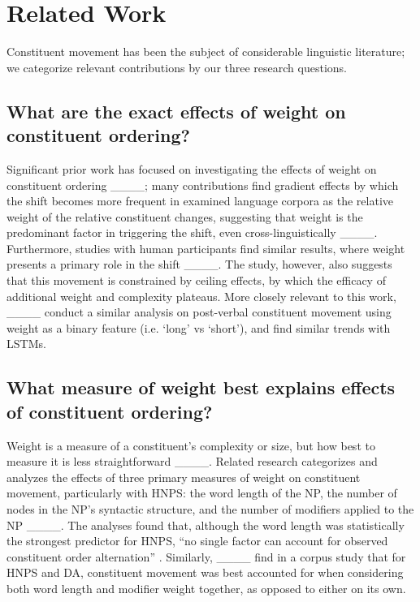\section{Related Work}
Constituent movement has been the subject of considerable linguistic literature; we categorize relevant contributions by our three research questions.

\subsection{What are the exact effects of weight on constituent ordering?}

Significant prior work has focused on investigating the effects of weight on constituent ordering ____; many contributions find gradient effects by which the shift becomes more frequent in examined language corpora as the relative weight of the relative constituent changes, suggesting that weight is the predominant factor in triggering the shift, even cross-linguistically ____. Furthermore, studies with human participants find similar results, where weight presents a primary role in the shift ____. The study, however, also suggests that this movement is constrained by ceiling effects, by which the efficacy of additional weight and complexity plateaus. More closely relevant to this work, ____ conduct a similar analysis on post-verbal constituent movement using weight as a binary feature (i.e. `long' vs `short'), and find similar trends with LSTMs. 

\subsection{What measure of weight best explains effects of constituent ordering?}

Weight is a measure of a constituent's complexity or size, but how best to measure it is less straightforward ____. Related research categorizes and analyzes the effects of three primary measures of weight on constituent movement, particularly with HNPS: the word length of the NP, the number of nodes in the NP's syntactic structure, and the number of modifiers applied to the NP ____. The analyses found that, although the word length was statistically the strongest predictor for HNPS, ``no single factor can account for observed constituent order alternation'' \cite[~pg.6]{Medeiros_Mains_McGowan_2021}. Similarly, ____ find in a corpus study that for HNPS and DA, constituent movement was best accounted for when considering both word length and modifier weight together, as opposed to either on its own.

